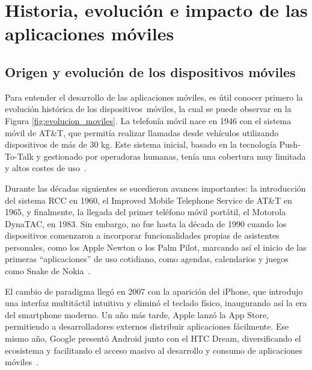 

\section{Historia, evolución e impacto de las aplicaciones móviles}

\subsection{Origen y evolución de los dispositivos móviles}
\vspace{-1.5ex}

Para entender el desarrollo de las aplicaciones móviles, es útil conocer primero la evolución histórica de los dispositivos móviles, la cual se puede observar en la Figura \ref{fig:evolucion_moviles}. La telefonía móvil nace en 1946 con el sistema móvil de AT\&T, que permitía realizar llamadas desde vehículos utilizando dispositivos de más de 30 kg. Este sistema inicial, basado en la tecnología Push-To-Talk y gestionado por operadoras humanas, tenía una cobertura muy limitada y altos costes de uso~\cite{agar2004}.



Durante las décadas siguientes se sucedieron avances importantes: la introducción del sistema RCC en 1960, el Improved Mobile Telephone Service de AT\&T en 1965, y finalmente, la llegada del primer teléfono móvil portátil, el Motorola DynaTAC, en 1983. Sin embargo, no fue hasta la década de 1990 cuando los dispositivos comenzaron a incorporar funcionalidades propias de asistentes personales, como los Apple Newton o los Palm Pilot, marcando así el inicio de las primeras ``aplicaciones'' de uso cotidiano, como agendas, calendarios y juegos como Snake de Nokia~\cite{west2010}.

El cambio de paradigma llegó en 2007 con la aparición del iPhone, que introdujo una interfaz multitáctil intuitiva y eliminó el teclado físico, inaugurando así la era del smartphone moderno. Un año más tarde, Apple lanzó la App Store, permitiendo a desarrolladores externos distribuir aplicaciones fácilmente. Ese mismo año, Google presentó Android junto con el HTC Dream, diversificando el ecosistema y facilitando el acceso masivo al desarrollo y consumo de aplicaciones móviles~\cite{murphy2014}.

